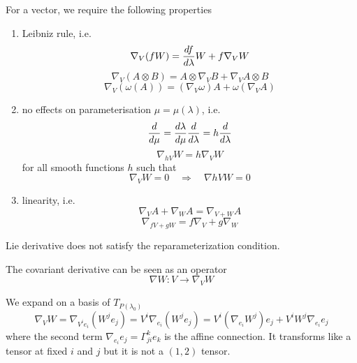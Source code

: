     For a vector, we require the following properties
    \begin{enumerate}
        \item Leibniz rule, i.e. 
            \begin{equation*}
                \nabla_V (f W) = \frac{df}{d\lambda} W + f \nabla_V W
            \end{equation*}
            \begin{equation*}
                \nabla_V (A \otimes B) = A \otimes \nabla_V B + \nabla_V A \otimes B
            \end{equation*}
            \begin{equation*}
                \nabla_V (\omega (A)) = (\nabla_V \omega) A + \omega (\nabla_V A)
            \end{equation*}
        \item no effects on parameterisation $\mu = \mu(\lambda)$, i.e. 
            \begin{equation*}
                \frac{d}{d\mu} = \frac{d\lambda}{d\mu} \frac{d}{d\lambda} = h \frac{d}{d\lambda}
            \end{equation*}
            \begin{equation*}
                \nabla_{h V} W = h \nabla_V W
            \end{equation*}
            for all smooth functions $h$ such that 
            \begin{equation*}
                \nabla_V W = 0 \quad \Rightarrow \quad \nabla{hV} W = 0
            \end{equation*}
        \item linearity, i.e.
            \begin{equation*}
                \nabla_V A + \nabla_W A = \nabla_{V + W} A
            \end{equation*}
            \begin{equation*}
                \nabla_{fV +gW} = f \nabla_V + g \nabla_W
            \end{equation*}
    \end{enumerate}

    Lie derivative does not satisfy the reparameterization condition. 

    The covariant derivative can be seen as an operator 
    \begin{equation*}
        \nabla W \colon V \rightarrow \nabla_V W
    \end{equation*}

    We expand on a basis of $T_{P(\lambda_0)}$ 
    \begin{equation*}
        \nabla_V W = \nabla_{V^i e_i} (W^j e_j) = V^i \nabla_{e_i} (W^j e_j) = V^i (\nabla_{e_i} W^j) e_j + V^i W^j \nabla_{e_i} e_j
    \end{equation*}
    where the second term $\nabla_{e_i} e_j = \Gamma^k_{ji} e_k$ is the affine connection. It transforms like a tensor at fixed $i$ and $j$ but it is not a $(1,2)$ tensor.

